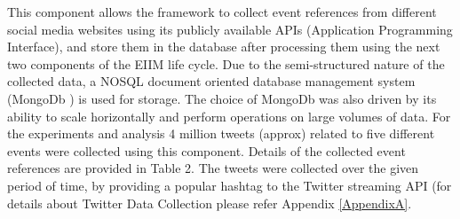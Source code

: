 This component allows the framework to collect event references from different social media websites using its publicly available APIs (Application Programming Interface), and store them in the database after processing them using the next two components of the EIIM life cycle. Due to the semi-structured nature of the collected data, a NOSQL document oriented database management system (MongoDb ) is used for storage. The choice of MongoDb was also driven by its ability to scale horizontally and perform operations on large volumes of data.
For the experiments and analysis 4 million tweets (approx) related to five different events were collected using this component. Details of the collected event references are provided in Table 2. The tweets were collected over the given period of time, by providing a popular hashtag to the Twitter streaming API  (for details about Twitter Data Collection please refer Appendix \ref{AppendixA}.

